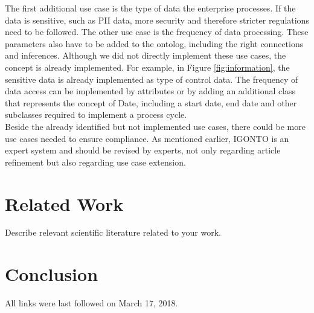 \documentclass[
  a4paper,  %
  twoside,  %
  bibliography=totoc,
  headsepline,
  cleardoublepage=empty,
  parskip=half,
  draft=false
]{scrbook}
\begin{document}
The first additional use case is the type of data the enterprise processes. If the data is sensitive, such as \acrshort{PII} data, more security and therefore stricter regulations need to be followed. The other use case is the frequency of data processing. These parameters also have to be added to the ontolog, including the right connections and inferences. Although we did not directly implement these use cases, the concept is already implemented. For example, in Figure \ref{fig:information}, the sensitive data is already implemented as type of control data. The frequency of data access can be implemented by attributes or by adding an additional class that represents the concept of Date, including a start date, end date and other subclasses required to implement a process cycle.\\
Beside the already identified but not implemented use cases, there could be more use cases needed to ensure compliance. As mentioned earlier, IGONTO is an expert system and should be revised by experts, not only regarding article refinement but also regarding use case extension.

\chapter{Related Work}

Describe relevant scientific literature related to your work.

\chapter{Conclusion}
\label{chap:zusfas}


\printbibliography

All links were last followed on March 17, 2018.

\appendix

\pagestyle{empty}
\renewcommand*{\chapterpagestyle}{empty}
\Versicherung
\end{document}
